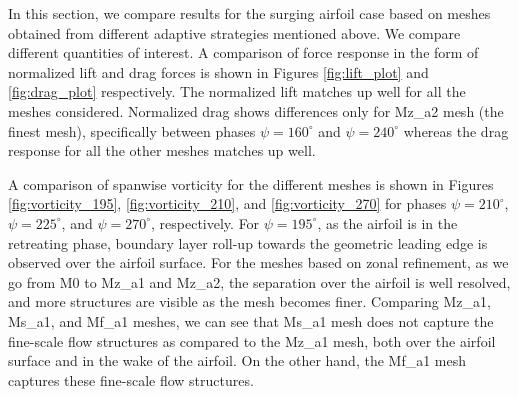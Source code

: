 In this section, we compare results for the surging airfoil case based on meshes obtained from different adaptive strategies mentioned above. 
We compare different quantities of interest. 
A comparison of force response in the form of normalized lift and drag forces is shown in Figures \ref{fig:lift_plot} and \ref{fig:drag_plot} respectively. The normalized lift matches up well for all the meshes considered. Normalized drag shows differences only for Mz\_a2 mesh (the finest mesh), specifically between phases $\psi=160^\circ$ and $\psi=240^\circ$ whereas the drag response for all the other meshes matches up well.

A comparison of spanwise vorticity for the different meshes is shown in Figures \ref{fig:vorticity_195}, \ref{fig:vorticity_210}, and \ref{fig:vorticity_270} for phases $\psi=210^\circ$, $\psi=225^\circ$, and $\psi=270^\circ$, respectively.
For $\psi=195^\circ$, as the airfoil is in the retreating phase, boundary layer roll-up towards the geometric leading edge is observed over the airfoil surface. For the meshes based on zonal refinement, as we go from M0 to Mz\_a1 and Mz\_a2, the separation over the airfoil is well resolved, and more structures are visible as the mesh becomes finer. Comparing Mz\_a1, Ms\_a1, and Mf\_a1 meshes, we can see that Ms\_a1 mesh does not capture the fine-scale flow structures as compared to the Mz\_a1 mesh, both over the airfoil surface and in the wake of the airfoil. On the other hand, the Mf\_a1 mesh captures these fine-scale flow structures.

